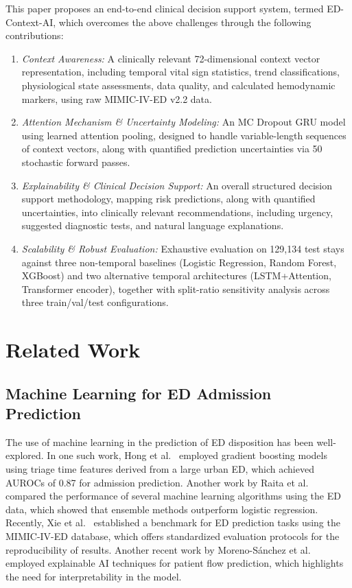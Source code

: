 \documentclass[runningheads]{llncs}
\begin{document}
This paper proposes an end-to-end clinical decision support system, termed ED-Context-AI, which overcomes the above challenges through the following contributions:

\begin{enumerate}
    \item \textit{Context Awareness:} A clinically relevant 72-dimensional context vector representation, including temporal vital sign statistics, trend classifications, physiological state assessments, data quality, and calculated hemodynamic markers, using raw MIMIC-IV-ED v2.2 data.
    \item \textit{Attention Mechanism \& Uncertainty Modeling:} An MC Dropout GRU model using learned attention pooling, designed to handle variable-length sequences of context vectors, along with quantified prediction uncertainties via 50 stochastic forward passes.
    \item \textit{Explainability \& Clinical Decision Support:} An overall structured decision support methodology, mapping risk predictions, along with quantified uncertainties, into clinically relevant recommendations, including urgency, suggested diagnostic tests, and natural language explanations.
    \item \textit{Scalability \& Robust Evaluation:} Exhaustive evaluation on 129,134 test stays against three non-temporal baselines (Logistic Regression, Random Forest, XGBoost) and two alternative temporal architectures (LSTM+Attention, Transformer encoder), together with split-ratio sensitivity analysis across three train/val/test configurations.
\end{enumerate}

\section{Related Work}

\subsection{Machine Learning for ED Admission Prediction}

The use of machine learning in the prediction of ED disposition has been well-explored. In one such work, Hong et al.~\cite{Hong2018} employed gradient boosting models using triage time features derived from a large urban ED, which achieved AUROCs of 0.87 for admission prediction. Another work by Raita et al.~\cite{Raita2019} compared the performance of several machine learning algorithms using the ED data, which showed that ensemble methods outperform logistic regression. Recently, Xie et al.~\cite{Xie2022} established a benchmark for ED prediction tasks using the MIMIC-IV-ED database, which offers standardized evaluation protocols for the reproducibility of results. Another recent work by Moreno-S\'{a}nchez et al.~\cite{Moreno2024} employed explainable AI techniques for patient flow prediction, which highlights the need for interpretability in the model.
\end{document}
